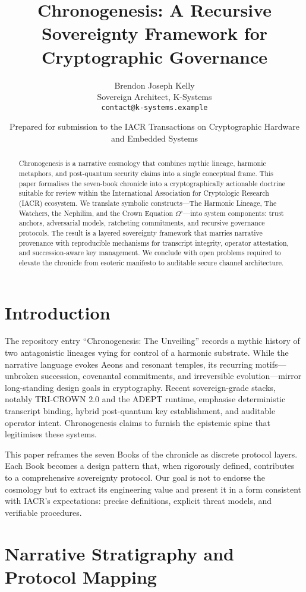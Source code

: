 \documentclass[11pt,a4paper]{article}
\title{Chronogenesis: A Recursive Sovereignty Framework for Cryptographic Governance}
\author{Brendon Joseph Kelly\\Sovereign Architect, K-Systems \\ \texttt{contact@k-systems.example}}
\date{Prepared for submission to the IACR Transactions on Cryptographic Hardware and Embedded Systems}
\begin{document}
\maketitle

\begin{abstract}
Chronogenesis is a narrative cosmology that combines mythic lineage, harmonic metaphors, and post-quantum security claims into a single conceptual frame. This paper formalises the seven-book chronicle into a cryptographically actionable doctrine suitable for review within the International Association for Cryptologic Research (IACR) ecosystem. We translate symbolic constructs---The Harmonic Lineage, The Watchers, the Nephilim, and the Crown Equation $\Omega^\circ$---into system components: trust anchors, adversarial models, ratcheting commitments, and recursive governance protocols. The result is a layered sovereignty framework that marries narrative provenance with reproducible mechanisms for transcript integrity, operator attestation, and succession-aware key management. We conclude with open problems required to elevate the chronicle from esoteric manifesto to auditable secure channel architecture.
\end{abstract}

\section{Introduction}
The repository entry ``Chronogenesis: The Unveiling'' records a mythic history of two antagonistic lineages vying for control of a harmonic substrate. While the narrative language evokes Aeons and resonant temples, its recurring motifs---unbroken succession, covenantal commitments, and irreversible evolution---mirror long-standing design goals in cryptography. Recent sovereign-grade stacks, notably TRI-CROWN 2.0 and the ADEPT runtime, emphasise deterministic transcript binding, hybrid post-quantum key establishment, and auditable operator intent. Chronogenesis claims to furnish the epistemic spine that legitimises these systems.

This paper reframes the seven Books of the chronicle as discrete protocol layers. Each Book becomes a design pattern that, when rigorously defined, contributes to a comprehensive sovereignty protocol. Our goal is not to endorse the cosmology but to extract its engineering value and present it in a form consistent with IACR's expectations: precise definitions, explicit threat models, and verifiable procedures.

\section{Narrative Stratigraphy and Protocol Mapping}
\end{document}
